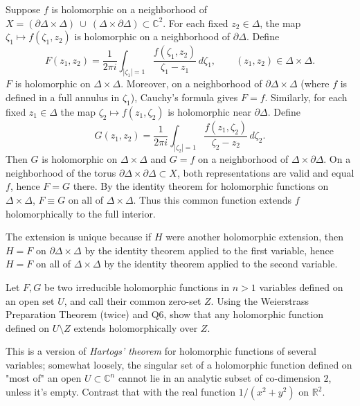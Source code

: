 \documentclass[12pt]{article}
\begin{document}
\begin{solution}
    Suppose $f$ is holomorphic on a neighborhood of $X = (\partial\Delta\times \Delta)\ \cup\ (\Delta\times \partial\Delta)\subset\mathbb{C}^2$. For each fixed $z_2\in\Delta$, the map $\zeta_1\mapsto f(\zeta_1,z_2)$ is holomorphic on a neighborhood of $\partial\Delta$. Define
    \[
        F(z_1,z_2) = \frac{1}{2\pi i}\int_{|\zeta_1|=1}\frac{f(\zeta_1,z_2)}{\zeta_1-z_1}\,d\zeta_1, \qquad (z_1,z_2)\in\Delta\times\Delta.
    \]
    $F$ is holomorphic on $\Delta\times\Delta$. Moreover, on a neighborhood of $\partial\Delta\times\Delta$ (where $f$ is defined in a full annulus in $\zeta_1$), Cauchy's formula gives $F=f$. Similarly, for each fixed $z_1\in\Delta$ the map $\zeta_2\mapsto f(z_1,\zeta_2)$ is holomorphic near $\partial\Delta$. Define
    \[
        G(z_1,z_2) = \frac{1}{2\pi i}\int_{|\zeta_2|=1}\frac{f(z_1,\zeta_2)}{\zeta_2-z_2}\,d\zeta_2.
    \]
    Then $G$ is holomorphic on $\Delta\times\Delta$ and $G=f$ on a neighborhood of $\Delta\times\partial\Delta$. On a neighborhood of the torus $\partial\Delta\times\partial\Delta\subset X$, both representations are valid and equal $f$, hence $F=G$ there. By the identity theorem for holomorphic functions on $\Delta\times\Delta$, $F\equiv G$ on all of $\Delta\times\Delta$. Thus this common function extends $f$ holomorphically to the full interior.

    The extension is unique because if $H$ were another holomorphic extension, then $H=F$ on $\partial\Delta\times\Delta$ by the identity theorem applied to the first variable, hence $H=F$ on all of $\Delta\times\Delta$ by the identity theorem applied to the second variable.
\end{solution}



\begin{exercise}
Let $F,G$ be two irreducible holomorphic functions in $n>1$ variables defined on an open set $U$, and call their common zero-set $Z$. Using the Weierstrass Preparation Theorem (twice) and Q6, show that any holomorphic function defined on $U\setminus Z$ extends holomorphically over $Z$.
\end{exercise}

\begin{remark}
    This is a version of \emph{Hartogs' theorem} for holomorphic functions of several variables; somewhat loosely, the singular set of a holomorphic function defined on "most of" an open $U \subset \mathbb{C}^n$ cannot lie in an analytic subset of co-dimension $2$, unless it's empty. Contrast that with the real function $1/(x^2+y^2)$ on $\mathbb{R}^2$.
\end{remark}
\end{document}
